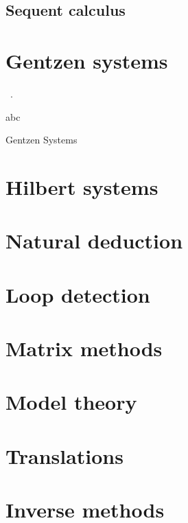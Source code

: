 \documentclass[]{article}
\begin{document}
\subsection{Sequent calculus}
\label{sec:sequent-calculus}



\section{Gentzen systems}
\label{sec:gentzen-systems}

~\cite{Kleene.1952.Metamathematics}.


abc~\cite{Dyckhoff.1992.JSL}

Gentzen Systems
\cite{Kleene.1952.Metamathematics}
\cite{Kleene.1952.Metamathematics}


\section{Hilbert systems}
\label{sec:hilbert-systems}


\section{Natural deduction}
\label{sec:natural-deduction}


\section{Loop detection}
\label{sec:loop-detection}

\section{Matrix methods}
\label{sec:matrix-methods}

\section{Model theory}
\label{sec:model-theory}

\section{Translations}
\label{sec:translations}

\section{Inverse methods}
\label{sec:inverse-method}
\end{document}
